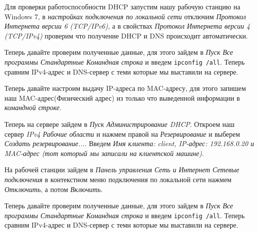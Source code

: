 Для проверки работоспособности DHCP запустим нашу рабочую станцию на Windows 7, в \textit{настройках подключения по локальной сети} отключим \textit{Протокол Интернета версии 6 (TCP/IPv6)}, а в свойствах \emph{Протокол Интернета версии 4 (TCP/IPv4)} проверим что получение DHCP и DNS происходит автоматически.
\par
Теперь давайте проверим полученные данные, для этого зайдем в \textit{Пуск \DLE Все программы \DLE Стандартные \DLE Командная строка} и введем \texttt{ipconfig /all}. Теперь сравним IPv4-адрес и DNS-сервер с теми которые мы выставили на сервере.
\par
Теперь давайте настроим выдачу IP-адреса по MAC-адресу, для этого запишем наш MAC-адрес(Физический адрес) из только что выведенной информации в \emph{командной строке}.
\par
Теперь на сервере зайдем в \emph{Пуск \DLE Администрирование \DLE DHCP}. Откроем наш сервер \emph{\DLE IPv4 \DLE Рабочие области} и нажмем правой на \emph{Резервирование} и выберем \emph{Создать резервирование...}. Введем \emph{Имя клиента: client, IP-адрес: 192.168.0.20 и MAC-адрес (тот который мы записали на клиентской машине)}.
\par
На рабочей станции зайдем в \emph{Панель управления \DLE Сеть и Интернет \DLE Сетевые подключения} в контекстном меню подключения по локальной сети нажмем \emph{Отключить}, а потом \emph{Включить}.
\par
Теперь давайте проверим полученные данные, для этого зайдем в \textit{Пуск \DLE Все программы \DLE Стандартные \DLE Командная строка} и введем \texttt{ipconfig /all}. Теперь сравним IPv4-адрес и DNS-сервер с теми которые мы выставили на сервере.
\newpage
